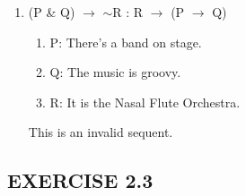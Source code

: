 \documentclass[a4paper,12pt]{article}
\newcommand{\mra}{$\rightarrow$ }
\newcommand{\ms}{$\sim$}
\begin{document}
\begin{enumerate}[label=\arabic*,leftmargin=*]
        \item (P \& Q) \mra \ms R : R \mra (P \mra Q)
            \nopagebreak
            \begin{enumerate}[label=(\roman*)]
                \item P: There's a band on stage.
                \item Q: The music is groovy.
                \item R: It is the Nasal Flute Orchestra.
            \end{enumerate}
            This is an invalid sequent.

    \end{enumerate}

    \subsection*{EXERCISE 2.3}
\end{document}

